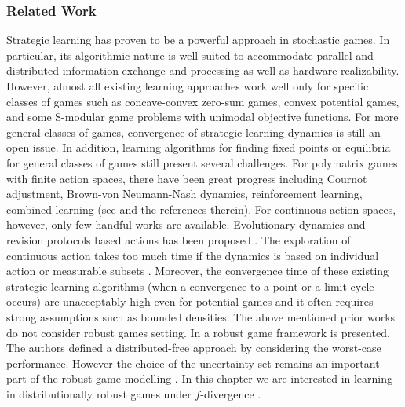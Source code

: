 \documentclass{article}
\begin{document}
\subsubsection{Related Work}
Strategic learning has proven to be a powerful approach in stochastic games. In particular, its algorithmic nature is well suited to accommodate parallel and distributed information exchange and processing as well as hardware realizability. However, almost all existing learning approaches work well only for specific classes of games such as concave-convex zero-sum games, convex potential games, and some S-modular game problems with unimodal objective functions. For more general classes of games, convergence of strategic learning dynamics is still an open issue. In addition, learning algorithms for finding fixed points or equilibria for general classes of games still present several challenges. For polymatrix games with finite action spaces, there have been great progress including Cournot adjustment, Brown-von Neumann-Nash dynamics, reinforcement learning, combined learning (see \cite{Tembine:2012:DSL:2378729} and the references therein). For continuous action spaces, however, only few handful works are available. Evolutionary dynamics and revision protocols based actions has been proposed \cite{FRIEDMAN2013743,conti1,FRIEDMAN2010691}. The exploration of continuous action takes too much time if the dynamics is based on individual action or measurable subsets \cite{7727688,PERKINS2014179,CHEUNG2014344}. Moreover, the convergence time of these existing strategic learning algorithms (when a convergence to a point or a limit cycle occurs) are unacceptably high even for potential games and it often requires strong assumptions such as bounded densities. The above mentioned prior works do not consider robust games setting. In \cite{Aghassi2006,doi:10.1137/080734510} a robust game framework is presented. The authors defined a distributed-free approach by considering the worst-case performance. However the choice of the uncertainty set remains an important part of the robust game modelling \cite{Bauso2016}. In this chapter we are interested in learning in distributionally robust games under $f$-divergence \cite{Csiszar1963,Morimoto1963,Silvey1966,Csiszar1967}.
\end{document}

